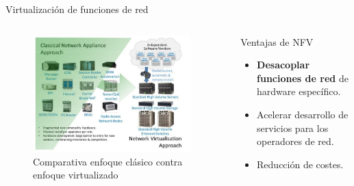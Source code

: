 \documentclass[aspectratio=169,xcolor=dvipsnames]{beamer}
\begin{document}
	\begin{frame}{Virtualización de funciones de red}
	
	\begin{columns}
	\begin{column}{0.6\textwidth}
	    \begin{figure}[h]
            \includegraphics[width=0.95\textwidth]{img/classic_network_vs_nfv.jpg}
            \caption{Comparativa enfoque clásico contra enfoque virtualizado}
       \end{figure}
	\end{column}
	
	\begin{column}{0.4\textwidth}
	\begin{alertblock}{Ventajas de NFV}
	    \begin{itemize}
	        \item \textbf{Desacoplar funciones de red} de hardware específico.
	        \item Acelerar desarrollo de servicios para los operadores de red.
	        \item Reducción de costes.
	    \end{itemize}
	\end{alertblock}
	\end{column}
	\end{columns}
	
	\end{frame}
	
\end{document}
